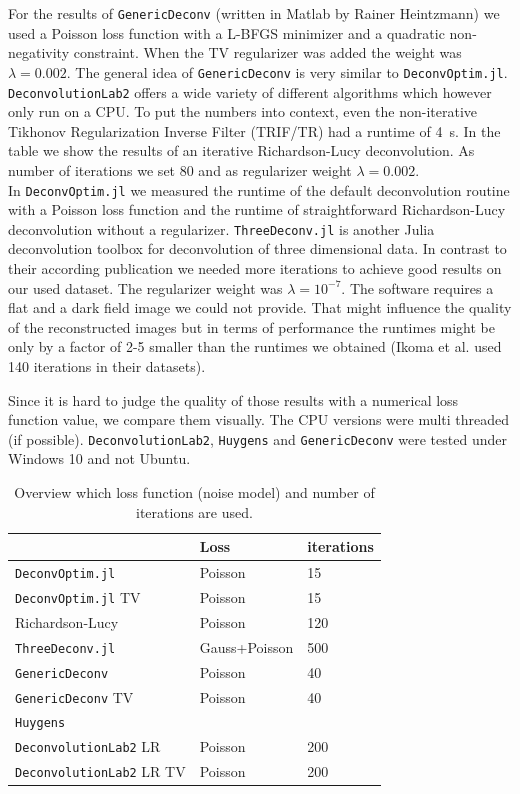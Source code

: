 \documentclass{juliacon}
\begin{document}
        For the results of \verb|GenericDeconv| (written in Matlab by Rainer Heintzmann) we used a Poisson loss function with a L-BFGS minimizer and a quadratic non-negativity constraint.
        When the TV regularizer was added the weight was $\lambda = 0.002$.
        The general idea of \verb|GenericDeconv| is very similar to \verb|DeconvOptim.jl|.
        \verb|DeconvolutionLab2| offers a wide variety of different algorithms which however only run on a CPU. To put the numbers into context, even the non-iterative Tikhonov Regularization Inverse Filter (TRIF/TR) had a runtime of \SI{4}{\second}. In the table we show the results of an 
        iterative Richardson-Lucy deconvolution. As number of iterations we set 80 and as regularizer weight $\lambda=0.002$.\\
        In \verb|DeconvOptim.jl| we measured the runtime of the default deconvolution routine with a Poisson loss function
        and the runtime of straightforward Richardson-Lucy deconvolution without a regularizer.
        \verb|ThreeDeconv.jl| is another Julia deconvolution toolbox for deconvolution of three dimensional data.
        In contrast to their according publication \cite{ikoma2018convex} we needed more iterations to achieve good results
        on our used dataset. The regularizer weight was $\lambda=10^{-7}$. 
        The software requires a flat and a dark field image we could not provide. That might influence the quality of the reconstructed images
        but in terms of performance the runtimes might be only by a factor of 2-5 smaller than the runtimes we obtained (Ikoma et al. used 140 iterations in their datasets).

        Since it is hard to judge the quality of those results with a numerical loss function value, we compare them visually.
        The CPU versions were multi threaded (if possible). \verb|DeconvolutionLab2|, \verb|Huygens| and \verb|GenericDeconv| were tested under Windows 10 and not Ubuntu.

        \begin{table}[h]
            \begin{tabular}{l l l}
                & Loss & iterations \\ 
            \hline
            \verb|DeconvOptim.jl| & Poisson & 15 \\
            \verb|DeconvOptim.jl| TV & Poisson & 15\\
            Richardson-Lucy & Poisson & 120 \\
            \verb|ThreeDeconv.jl|  & Gauss+Poisson& 500\\
            \verb|GenericDeconv|  & Poisson & 40\\
            \verb|GenericDeconv| TV & Poisson & 40 \\
            \verb|Huygens|  & & \\
            \verb|DeconvolutionLab2| LR & Poisson & 200\\
            \verb|DeconvolutionLab2| LR TV& Poisson & 200 
            \end{tabular}
            \caption{Overview which loss function (noise model) and number of iterations are used.}
            \label{tab:deconvprop}
        \end{table}
\end{document}
